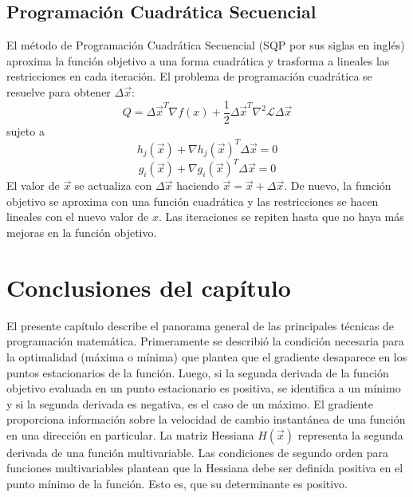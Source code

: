 \subsection{Programación Cuadrática Secuencial}
El método de Programación Cuadrática Secuencial (SQP por sus siglas en inglés) aproxima la función objetivo a una forma cuadrática y trasforma a lineales las restricciones en cada iteración. El problema de programación cuadrática se resuelve para obtener $\Delta \vec{x}$:
\begin{equation}
Q=\Delta \vec{x}^T \nabla f(x)+ \frac{1}{2}\Delta \vec{x}^T \nabla^2 \mathcal{L} \Delta \vec{x}
\end{equation}
sujeto a
\begin{equation}
h_j(\vec{x})+ \nabla h_j(\vec{x})^T \Delta \vec{x}=0
\end{equation}
\begin{equation}
g_i(\vec{x})+ \nabla g_i(\vec{x})^T \Delta \vec{x}=0
\end{equation}
El valor de $\vec{x}$ se actualiza con $\Delta \vec{x}$ haciendo  $\vec{x}=\vec{x}+\Delta \vec{x}$. De nuevo, la función objetivo se aproxima con una función cuadrática y las restricciones se hacen lineales con el nuevo valor de $x$. Las iteraciones se repiten hasta que no haya más mejoras en la función objetivo.
\section{Conclusiones del capítulo}
El presente capítulo describe el panorama general de las principales técnicas de programación matemática. Primeramente se describió la condición necesaria para la optimalidad (máxima o mínima) que plantea que el gradiente desaparece en los puntos estacionarios de la función. Luego, si la segunda derivada de la función objetivo evaluada en un punto estacionario es positiva, se identifica a un mínimo y si la segunda derivada es negativa, es el caso de un máximo. El gradiente proporciona información sobre la velocidad de cambio instantánea de una función en una dirección en particular. La matriz Hessiana $H(\vec{x})$ representa la segunda derivada de una función multivariable. Las condiciones de segundo orden para funciones multivariables plantean que la Hessiana debe ser definida positiva en el punto mínimo de la función. Esto es, que su determinante es positivo.

